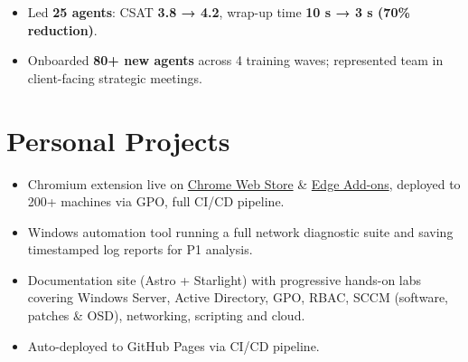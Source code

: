 \documentclass[10pt]{article}
\begin{document}
\vspace{3pt}

\begin{itemize}
  \item Led \textbf{25 agents}: CSAT \textbf{3.8 → 4.2}, wrap-up time \textbf{10 s → 3 s (70\%
        reduction)}.
  \item Onboarded \textbf{80+ new agents} across 4 training waves; represented team in
        client-facing strategic meetings.
\end{itemize}

\section{Personal Projects}

\begin{itemize}
  \item 
  Chromium extension live on \href{https://chromewebstore.google.com/detail/tab-monitor/apbgiakfdalcpmnopopopookdceecnfj}{Chrome Web Store}
      \& \href{https://microsoftedge.microsoft.com/addons/detail/tab-monitor/aidfbccdmjdoloknpoiacciagffokjcb}{Edge Add-ons},
      deployed to 200+ machines via GPO, full CI/CD pipeline.
\end{itemize}

\vspace{3pt}

\begin{itemize}
  \item Windows automation tool running a full network diagnostic suite and saving timestamped
        log reports for P1 analysis.
\end{itemize}

\begin{itemize}
  \item Documentation site (Astro + Starlight) with progressive hands-on labs covering Windows Server,
        Active Directory, GPO, RBAC, SCCM (software, patches \& OSD), networking, scripting and cloud.
  \item Auto-deployed to GitHub Pages via CI/CD pipeline.
\end{itemize}
\end{document}
